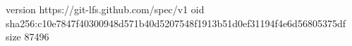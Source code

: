 version https://git-lfs.github.com/spec/v1
oid sha256:c10e7847f40300948d571b40d5207548f1913b51d0ef31194f4e6d56805375df
size 87496
